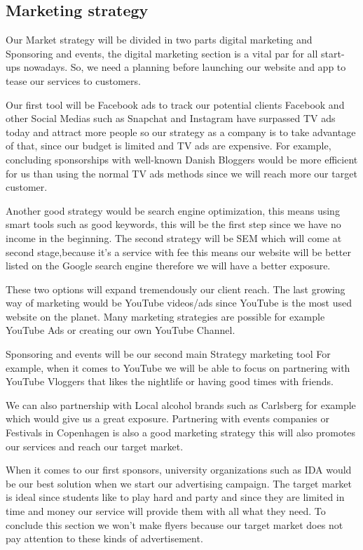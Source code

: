 \documentclass[12p]{article}
\begin{document}
\newpage


\subsection{Marketing strategy} \label{MarketingStrategy}
Our Market strategy will be divided in two parts digital marketing and Sponsoring and events, the digital marketing section is a vital par for all start-ups nowadays.
So, we need a planning before launching our website and app to tease our services to customers.

Our first tool will be Facebook ads to track our potential clients Facebook and other Social Medias such as Snapchat and Instagram have surpassed TV ads today and attract more people so our strategy as a company is to take advantage of that, since our budget is limited and TV ads are expensive. 
For example, concluding sponsorships with well-known Danish Bloggers would be more efficient for us than using the normal TV ads methods since we will reach more our target customer.

Another good strategy would be search engine optimization, this means using smart tools such as good keywords, this will be the first step since we have no income in the beginning.
The second strategy will be SEM which will come at second stage,because it's a service with fee  this means our website will be better listed on the Google search engine therefore we will have a better exposure.

These two options will expand tremendously our client reach.
The last growing way of marketing would be YouTube videos/ads since YouTube is the most used website on the planet.
Many marketing strategies are possible for example YouTube Ads or creating our own YouTube Channel.

Sponsoring and events will be our second main Strategy marketing tool
For example, when it comes to YouTube we will be able to focus on partnering with YouTube Vloggers that likes the nightlife or having good times with friends.

We can also partnership with Local alcohol brands such as Carlsberg for example which would give us a great exposure.
Partnering with events companies or Festivals in Copenhagen is also a good marketing strategy this will also promotes our services and reach our target market.

When it comes to our first sponsors, university organizations such as IDA would be our best solution when we start our advertising campaign.
The target market is ideal since students like to play hard and party and since they are limited in time and money our service will provide them with all what they need. To conclude this section we won’t make flyers because our target market does not pay attention to these kinds of advertisement.
\end{document}
